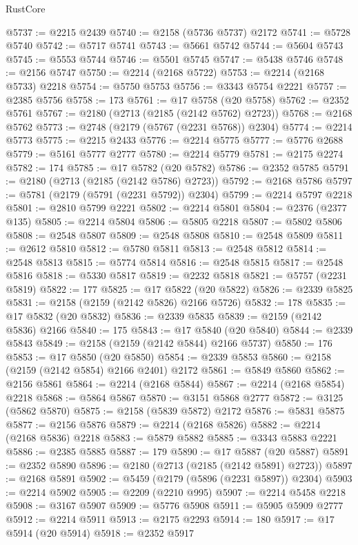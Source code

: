 \begin{lexlean}{RustCore}
\begin{coremodule}
@5737 := @2215 @2439
@5740 := @2158 (@5736 @5737) @2172
@5741 := @5728 @5740
@5742 := @5717 @5741
@5743 := @5661 @5742
@5744 := @5604 @5743
@5745 := @5553 @5744
@5746 := @5501 @5745
@5747 := @5438 @5746
@5748 := @2156 @5747
@5750 := @2214 (@2168 @5722)
@5753 := @2214 (@2168 @5733) @2218
@5754 := @5750 @5753
@5756 := @3343 @5754 @2221
@5757 := @2385 @5756
@5758 := 173
@5761 := @17 @5758 (@20 @5758)
@5762 := @2352 @5761
@5767 := @2180 (@2713 (@2185 (@2142 @5762) @2723))
@5768 := @2168 @5762
@5773 := @2748 (@2179 (@5767 (@2231 @5768)) @2304)
@5774 := @2214 @5773
@5775 := @2215 @2433
@5776 := @2214 @5775
@5777 := @5776 @2688
@5779 := @5161 @5777 @2777
@5780 := @2214 @5779
@5781 := @2175 @2274
@5782 := 174
@5785 := @17 @5782 (@20 @5782)
@5786 := @2352 @5785
@5791 := @2180 (@2713 (@2185 (@2142 @5786) @2723))
@5792 := @2168 @5786
@5797 := @5781 (@2179 (@5791 (@2231 @5792)) @2304)
@5799 := @2214 @5797 @2218
@5801 := @2810 @5799 @2221
@5802 := @2214 @5801
@5804 := @2376 (@2377 @135)
@5805 := @2214 @5804
@5806 := @5805 @2218
@5807 := @5802 @5806
@5808 := @2548 @5807
@5809 := @2548 @5808
@5810 := @2548 @5809
@5811 := @2612 @5810
@5812 := @5780 @5811
@5813 := @2548 @5812
@5814 := @2548 @5813
@5815 := @5774 @5814
@5816 := @2548 @5815
@5817 := @2548 @5816
@5818 := @5330 @5817
@5819 := @2232 @5818
@5821 := @5757 (@2231 @5819)
@5822 := 177
@5825 := @17 @5822 (@20 @5822)
@5826 := @2339 @5825
@5831 := @2158 (@2159 (@2142 @5826) @2166 @5726)
@5832 := 178
@5835 := @17 @5832 (@20 @5832)
@5836 := @2339 @5835
@5839 := @2159 (@2142 @5836) @2166
@5840 := 175
@5843 := @17 @5840 (@20 @5840)
@5844 := @2339 @5843
@5849 := @2158 (@2159 (@2142 @5844) @2166 @5737)
@5850 := 176
@5853 := @17 @5850 (@20 @5850)
@5854 := @2339 @5853
@5860 := @2158 (@2159 (@2142 @5854) @2166 @2401) @2172
@5861 := @5849 @5860
@5862 := @2156 @5861
@5864 := @2214 (@2168 @5844)
@5867 := @2214 (@2168 @5854) @2218
@5868 := @5864 @5867
@5870 := @3151 @5868 @2777
@5872 := @3125 (@5862 @5870)
@5875 := @2158 (@5839 @5872) @2172
@5876 := @5831 @5875
@5877 := @2156 @5876
@5879 := @2214 (@2168 @5826)
@5882 := @2214 (@2168 @5836) @2218
@5883 := @5879 @5882
@5885 := @3343 @5883 @2221
@5886 := @2385 @5885
@5887 := 179
@5890 := @17 @5887 (@20 @5887)
@5891 := @2352 @5890
@5896 := @2180 (@2713 (@2185 (@2142 @5891) @2723))
@5897 := @2168 @5891
@5902 := @5459 (@2179 (@5896 (@2231 @5897)) @2304)
@5903 := @2214 @5902
@5905 := @2209 (@2210 @995)
@5907 := @2214 @5458 @2218
@5908 := @3167 @5907
@5909 := @5776 @5908
@5911 := @5905 @5909 @2777
@5912 := @2214 @5911
@5913 := @2175 @2293
@5914 := 180
@5917 := @17 @5914 (@20 @5914)
@5918 := @2352 @5917

\end{coremodule}
\end{lexlean}
